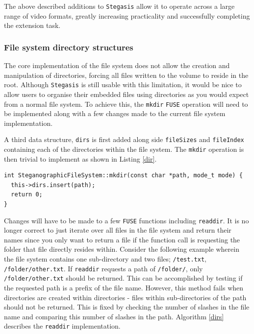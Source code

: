 \documentclass[paper=a4, fontsize=11pt,twoside]{scrartcl}
\numberwithin{table}{section}
\numberwithin{figure}{section}
\numberwithin{algorithm}{section}
\begin{document}
\noindent
The above described additions to \texttt{Stegasis} allow it to operate across a large range of video formats, greatly increasing practicality and successfully completing the extension task.

\subsubsection{File system directory structures}

The core implementation of the file system does not allow the creation and manipulation of directories, forcing all files written to the volume to reside in the root. Although \texttt{Stegasis} is still usable with this limitation, it would be nice to allow users to organise their embedded files using directories as you would expect from a normal file system. To achieve this, the \texttt{mkdir} \texttt{FUSE} operation will need to be implemented along with a few changes made to the current file system implementation.

A third data structure, \texttt{dirs} is first added along side \texttt{fileSizes} and \texttt{fileIndex} containing each of the directories within the file system. The \texttt{mkdir} operation is then trivial to implement as shown in Listing \ref{dir}.

\begin{lstlisting}[caption={\texttt{FUSE} mkdir implementation (\texttt{fs/stegfs.cc:158}).}, frame=single, label=dir]
int SteganographicFileSystem::mkdir(const char *path, mode_t mode) {
  this->dirs.insert(path);
  return 0;
}
\end{lstlisting}

Changes will have to be made to a few \texttt{FUSE} functions including \texttt{readdir}. It is no longer correct to just iterate over all files in the file system and return their names since you only want to return a file if the function call is requesting the folder that file directly resides within. Consider the following example wherein the file system contains one sub-directory and two files; \texttt{/test.txt}, \texttt{/folder/other.txt}. If \texttt{readdir} requests a path of \texttt{/folder/}, only \texttt{/folder/other.txt} should be returned. This can be accomplished by testing if the requested path is a prefix of the file name. However, this method fails when directories are created within directories - files within sub-directories of the path should not be returned. This is fixed by checking the number of slashes in the file name and comparing this number of slashes in the path. Algorithm \ref{dirs} describes the \texttt{readdir} implementation.
\end{document}
